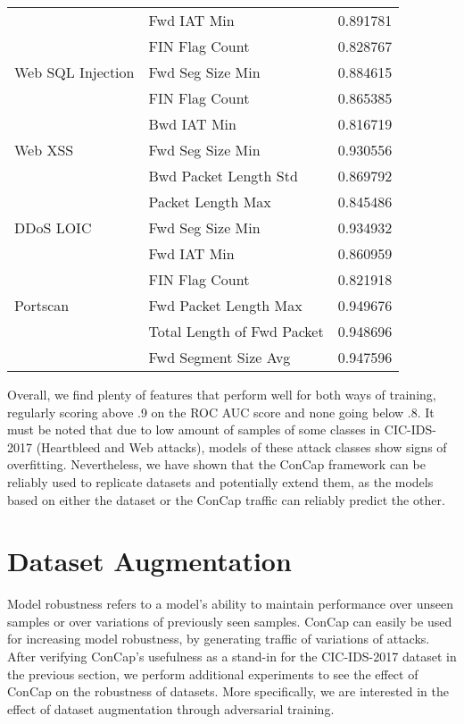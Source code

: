 \documentclass[conference]{IEEEtran}
\begin{document}
\begin{table}
\begin{tabular}{ m{10em}  m{10em} m{8em} }
			{} & Fwd IAT Min & 0.891781\\
			{} & FIN Flag Count & 0.828767\\
			\midrule
			Web SQL Injection & Fwd Seg Size Min & 0.884615\\
			{} & FIN Flag Count & 0.865385\\
			{} & Bwd IAT Min & 0.816719\\
			\midrule
			Web XSS & Fwd Seg Size Min & 0.930556\\
			{} &  Bwd Packet Length Std & 0.869792\\
			{} & Packet Length Max & 0.845486\\
			\midrule
			DDoS LOIC & Fwd Seg Size Min & 0.934932\\
			{} & Fwd IAT Min & 0.860959\\
			{} & FIN Flag Count & 0.821918\\
			\midrule
			Portscan & Fwd Packet Length Max & 0.949676\\
			{} & Total Length of Fwd Packet & 0.948696\\
			{} & Fwd Segment Size Avg & 0.947596\\
			\midrule
		\end{tabular}
		\label{tab:results}
	\end{table}
	
	Overall, we find plenty of features that perform well for both ways of training, regularly scoring above .9 on the ROC AUC score and none going below .8. It must be noted that due to low amount of samples of some classes in CIC-IDS-2017 (Heartbleed and Web attacks), models of these attack classes show signs of overfitting. Nevertheless, we have shown that the ConCap framework can be reliably used to replicate datasets and potentially extend them, as the models based on either the dataset or the ConCap traffic can reliably predict the other.
	
	\section{Dataset Augmentation}\label{augmentation}
	Model robustness refers to a model's ability to maintain performance over unseen samples or over variations of previously seen samples. ConCap can easily be used for increasing model robustness, by generating traffic of variations of attacks. 
	After verifying ConCap's usefulness as a stand-in for the CIC-IDS-2017 dataset in the previous section, we perform additional experiments to see the effect of ConCap on the robustness of datasets. More specifically, we are interested in the effect of dataset augmentation through adversarial training.
	
\end{document}
